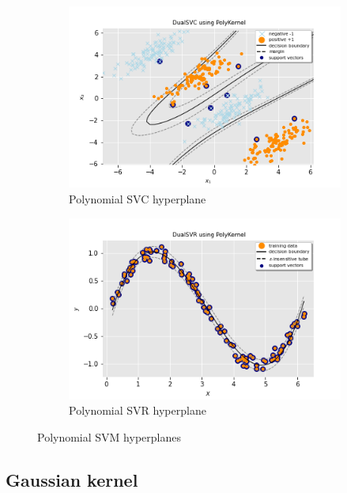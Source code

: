\begin{figure}
	\centering
	\begin{subfigure}{.49\textwidth}
		\centering
		\includegraphics[width=\textwidth]{img/poly_dual_svc_hyperplane.png}
		\caption{Polynomial SVC hyperplane}
		\label{fig:poly_dual_svc_hyperplane}
	\end{subfigure}
	\begin{subfigure}{.49\textwidth}
		\centering
		\captionsetup{justification=centering}
		\includegraphics[width=\textwidth]{img/poly_dual_svr_hyperplane.png}
		\caption{Polynomial SVR hyperplane}
		\label{fig:poly_dual_svr_hyperplane}
	\end{subfigure}
\caption{Polynomial SVM hyperplanes}
\end{figure}

\subsection{Gaussian kernel}


